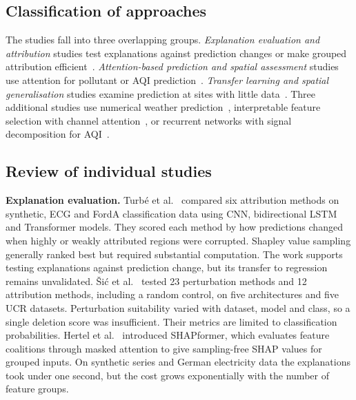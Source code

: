 \documentclass[pdflatex,sn-mathphys-num]{sn-jnl}
\begin{document}
\subsection{Classification of approaches}
The studies fall into three overlapping groups. \emph{Explanation evaluation and attribution} studies test explanations against prediction changes or make grouped attribution efficient~\cite{turbe,simic,hertel}. \emph{Attention-based prediction and spatial assessment} studies use attention for pollutant or AQI prediction~\cite{li,zhang,liu25,chen23,liu23}. \emph{Transfer learning and spatial generalisation} studies examine prediction at sites with little data~\cite{ma,poelzl}. Three additional studies use numerical weather prediction~\cite{ppn}, interpretable feature selection with channel attention~\cite{yang}, or recurrent networks with signal decomposition for AQI~\cite{huang}.

\subsection{Review of individual studies}
\textbf{Explanation evaluation.} Turb\'e et al.~\cite{turbe} compared six attribution methods on synthetic, ECG and FordA classification data using CNN, bidirectional LSTM and Transformer models. They scored each method by how predictions changed when highly or weakly attributed regions were corrupted. Shapley value sampling generally ranked best but required substantial computation. The work supports testing explanations against prediction change, but its transfer to regression remains unvalidated. \v{S}i\'c et al.~\cite{simic} tested 23 perturbation methods and 12 attribution methods, including a random control, on five architectures and five UCR datasets. Perturbation suitability varied with dataset, model and class, so a single deletion score was insufficient. Their metrics are limited to classification probabilities. Hertel et al.~\cite{hertel} introduced SHAPformer, which evaluates feature coalitions through masked attention to give sampling-free SHAP values for grouped inputs. On synthetic series and German electricity data the explanations took under one second, but the cost grows exponentially with the number of feature groups.
\end{document}
